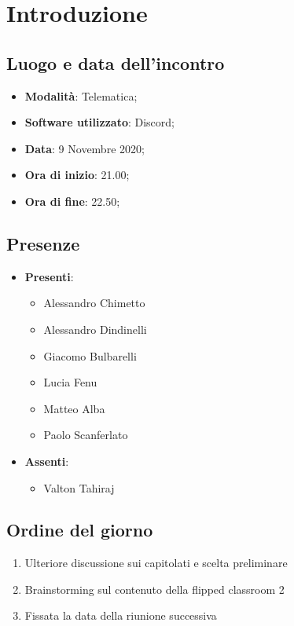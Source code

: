 \documentclass[]{article}
\begin{document}
	
	
	
	\newpage


	\section{Introduzione}
	\subsection{Luogo e data dell'incontro}
	\begin{itemize}
		\item \textbf{Modalità}: Telematica;
		\item \textbf{Software utilizzato}: Discord;
		\item \textbf{Data}: 9 Novembre 2020;
		\item \textbf{Ora di inizio}: 21.00;
		\item \textbf{Ora di fine}: 22.50;
	\end{itemize}

	\subsection{Presenze}
	\begin{itemize}
		\item \textbf{Presenti}: 
		\begin{itemize}
			\item Alessandro Chimetto
			\item Alessandro Dindinelli
			\item Giacomo Bulbarelli
			\item Lucia Fenu
			\item Matteo Alba
			\item Paolo Scanferlato
		\end{itemize}
		\item \textbf{Assenti}: 
		\begin{itemize}
			\item Valton Tahiraj
		\end{itemize}
	\end{itemize}


	\subsection{Ordine del giorno}
	\begin{enumerate}
		\item Ulteriore discussione sui capitolati e scelta preliminare
		\item Brainstorming sul contenuto della flipped classroom 2
		\item Fissata la data della riunione successiva
	\end{enumerate}
\end{document}
